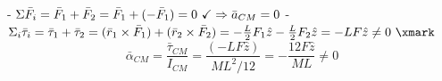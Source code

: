 - $\Sigma \bar{F}_i = \bar{F}_1 + \bar{F}_2 = \bar{F}_1 + (-\bar{F}_1) = 0 \text{ \checkmark } \Rightarrow \bar{a}_{CM} = 0$
- $\Sigma_i \bar{\tau}_i = \bar{\tau}_1 + \bar{\tau}_2 = (\bar{r}_1 \times \bar{F}_1) + (\bar{r}_2 \times \bar{F}_2) = -\frac{L}{2} F_1 \hat{z} - \frac{L}{2} F_2 \hat{z} = -L F \hat{z} \neq 0 \text{ \xmark}$
$$ \bar{\alpha}_{CM} = \frac{\bar{\tau}_{CM}}{I_{CM}} = \frac{(-L F \hat{z})}{M L^2/12} = - \frac{12 F \hat{z}}{M L} \neq 0 $$

